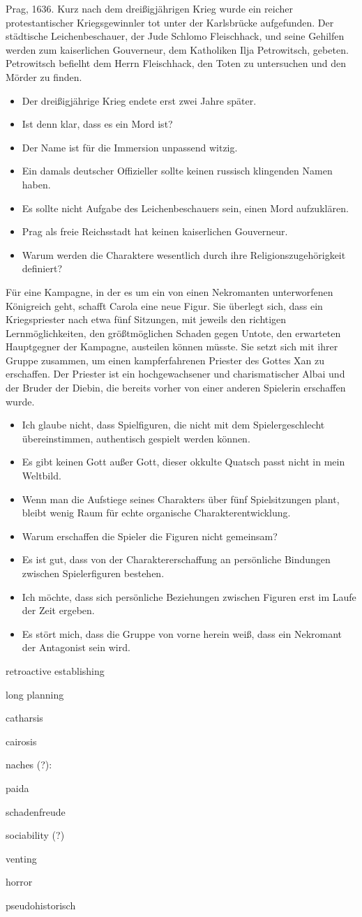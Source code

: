 \documentclass{article}
\begin{document}
Prag, 1636. Kurz nach dem dreißigjährigen Krieg wurde ein reicher protestantischer Kriegsgewinnler tot unter der Karlsbrücke aufgefunden.
Der städtische Leichenbeschauer, der Jude Schlomo Fleischhack,
und seine Gehilfen werden zum kaiserlichen Gouverneur, dem Katholiken Ilja Petrowitsch, gebeten.
Petrowitsch befielht dem Herrn Fleischhack, den Toten zu untersuchen und den Mörder zu finden.
\begin{itemize}
\item Der dreißigjährige Krieg endete erst zwei Jahre später.
\item Ist denn klar, dass es ein Mord ist?
\item Der Name ist für die Immersion unpassend witzig.
\item Ein damals deutscher Offizieller sollte keinen russisch klingenden Namen haben.
\item Es sollte nicht Aufgabe des Leichenbeschauers sein, einen Mord aufzuklären.
\item Prag als freie Reichsstadt hat keinen kaiserlichen Gouverneur.
\item Warum werden die Charaktere wesentlich durch ihre Religionszugehörigkeit definiert?
\end{itemize}

Für eine Kampagne, in der es um ein von einen Nekromanten
unterworfenen Königreich geht, schafft Carola eine neue Figur.  Sie
überlegt sich, dass ein Kriegspriester nach etwa fünf Sitzungen, mit
jeweils den richtigen Lernmöglichkeiten, den größtmöglichen Schaden
gegen Untote, den erwarteten Hauptgegner der Kampagne, austeilen
können müsste. Sie setzt sich mit ihrer Gruppe zusammen, um einen
kampferfahrenen Priester des Gottes Xan zu erschaffen. Der Priester
ist ein hochgewachsener und charismatischer Albai und der Bruder der
Diebin, die bereits vorher von einer anderen Spielerin erschaffen wurde.
\begin{itemize}
\item Ich glaube nicht, dass Spielfiguren, die nicht mit dem Spielergeschlecht übereinstimmen, authentisch gespielt werden können.
\item Es gibt keinen Gott außer Gott, dieser okkulte Quatsch passt nicht in mein Weltbild.
\item Wenn man die Aufstiege seines Charakters über fünf Spielsitzungen plant, bleibt wenig Raum für echte organische Charakterentwicklung.
\item Warum erschaffen die Spieler die Figuren nicht gemeinsam?
\item Es ist gut, dass von der Charaktererschaffung an persönliche Bindungen zwischen Spielerfiguren bestehen.
\item Ich möchte, dass sich persönliche Beziehungen zwischen Figuren erst im Laufe der Zeit ergeben.
\item Es stört mich, dass die Gruppe von vorne herein weiß, dass ein Nekromant der Antagonist sein wird.
\end{itemize}


retroactive establishing

long planning

catharsis

cairosis

naches (?):

paida

schadenfreude

sociability (?)

venting

horror

pseudohistorisch 
\end{document}
